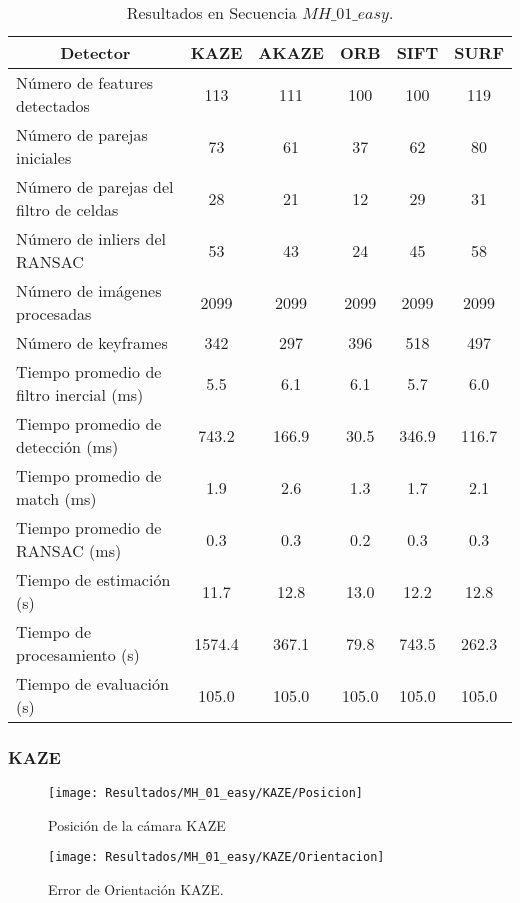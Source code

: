 \begin{table}[H]
	\caption{Resultados en Secuencia $MH\_ 01\_ easy$.}
	\begin{tabular}{|l|c|c|c|c|c|}
		\hline
		\multicolumn{1}{|c|}{\textbf{Detector}} & \textbf{KAZE} & \textbf{AKAZE} & \textbf{ORB} & \textbf{SIFT} & \textbf{SURF} \\ \hline
		Número de features detectados & 113 & 111 & 100 & 100 & 119 \\ \hline
		Número de parejas iniciales & 73 & 61 & 37 & 62 & 80 \\ \hline
		Número de parejas del filtro de celdas & 28 & 21 & 12 & 29 & 31 \\ \hline
		Número de inliers del RANSAC & 53 & 43 & 24 & 45 & 58 \\ \hline
		Número de imágenes procesadas & 2099 & 2099 & 2099 & 2099 & 2099 \\ \hline
		Número de keyframes & 342 & 297 & 396 & 518 & 497 \\ \hline
		Tiempo promedio de filtro inercial (ms) & 5.5 & 6.1 & 6.1 & 5.7 & 6.0 \\ \hline
		Tiempo promedio de detección  (ms) & 743.2 & 166.9 & 30.5 & 346.9 & 116.7 \\ \hline
		Tiempo promedio de match (ms) & 1.9 & 2.6 & 1.3 & 1.7 & 2.1 \\ \hline
		Tiempo promedio de RANSAC (ms) & 0.3 & 0.3 & 0.2 & 0.3 & 0.3 \\ \hline
		Tiempo de estimación (s) & 11.7 & 12.8 & 13.0 & 12.2 & 12.8 \\ \hline
		Tiempo de  procesamiento (s) & 1574.4 & 367.1 & 79.8 & 743.5 & 262.3 \\ \hline
		Tiempo de evaluación (s) & 105.0 & 105.0 & 105.0 & 105.0 & 105.0 \\ \hline
	\end{tabular}
	\label{Tabla/Resultados/MH_01_easy}
\end{table}


\subsubsection{KAZE}


\begin{figure}[H]
	\centering
	\texttt{[image: Resultados/MH\_01\_easy/KAZE/Posicion]}
	\caption{Posición de la cámara KAZE}
	\label{imagen:Resultados/MH_01_easy/KAZE/Posicion}
\end{figure}


\begin{figure}[H]
	\centering
	\texttt{[image: Resultados/MH\_01\_easy/KAZE/Orientacion]}
	\caption[Error de Orientación KAZE]{Error de Orientación KAZE.}
	\label{imagen:Resultados/MH_01_easy/KAZE/Orientacion}
\end{figure}


